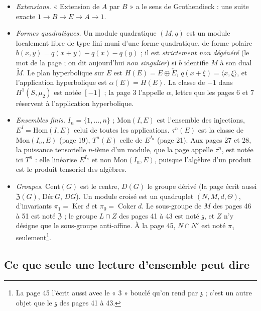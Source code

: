 \documentclass[11pt,a4paper]{article}
\begin{document}
\begin{itemize}
  \item \emph{Extensions.} « Extension de $A$ par $B$ » a le sens de
  Grothendieck : une suite exacte $1 \to B \to E \to A \to 1$.
  \item \emph{Formes quadratiques.} Un module quadratique $(M, q)$ est un
  module localement libre de type fini muni d'une forme quadratique, de
  forme polaire $b(x, y) = q(x+y) - q(x) - q(y)$ ; il est
  \emph{strictement non dégénéré} (le mot de la page ; on dit aujourd'hui
  \emph{non singulier}) si $b$ identifie $M$ à son dual $\check{M}$. Le plan
  hyperbolique sur $E$ est $H(E) = E \oplus \check{E}$, $q(x + \xi) =
  \langle x, \xi \rangle$, et l'application hyperbolique est
  $\alpha(E) = H(E)$. La classe de $-1$ dans $H^{1}(S, \mu_2)$ est notée
  $[-1]$ ; la page 3 l'appelle $\alpha$, lettre que les pages 6 et 7
  réservent à l'application hyperbolique.
  \item \emph{Ensembles finis.} $I_n = \{1, \dots, n\}$ ; $\mathrm{Mon}(I, E)$
  est l'ensemble des injections, $E^{I} = \mathrm{Hom}(I, E)$ celui de
  toutes les applications. $\tau^{n}(E)$ est la classe de
  $\mathrm{Mon}(I_n, E)$ (page 19), $T^{n}(E)$ celle de $E^{I_n}$ (page 21).
  Aux pages 27 et 28, la puissance tensorielle $n$-ième d'un module, que la
  page appelle $\tau^{n}$, est notée ici $T^{n}$ : elle linéarise
  $E^{I_n}$ et non $\mathrm{Mon}(I_n, E)$, puisque l'algèbre d'un produit
  est le produit tensoriel des algèbres.
  \item \emph{Groupes.} $\mathrm{Cent}(G)$ est le centre, $D(G)$ le groupe
  dérivé (la page écrit aussi $\mathfrak{Z}(G)$, $\mathrm{Dér}\,G$, $DG$).
  Un module croisé est un quadruplet $(N, M, d, \Theta)$, d'invariants
  $\pi_1 = \operatorname{Ker} d$ et $\pi_0 = \operatorname{Coker} d$. Le
  sous-groupe de $M$ des pages 46 à 51 est noté $\mathfrak{Z}$ ; le groupe
  $L \cap Z$ des pages 41 à 43 est noté $\mathfrak{z}$, et $Z$ n'y désigne
  que le sous-groupe anti-affine. À la page 45, $N \cap N'$ est noté
  $\pi_1$ seulement\footnote{La page 45 l'écrit aussi avec le « 3 » bouclé
  qu'on rend par $\mathfrak{z}$ ; c'est un autre objet que le $\mathfrak{z}$
  des pages 41 à 43.}.
\end{itemize}

\subsection*{Ce que seule une lecture d'ensemble peut dire}
\end{document}
